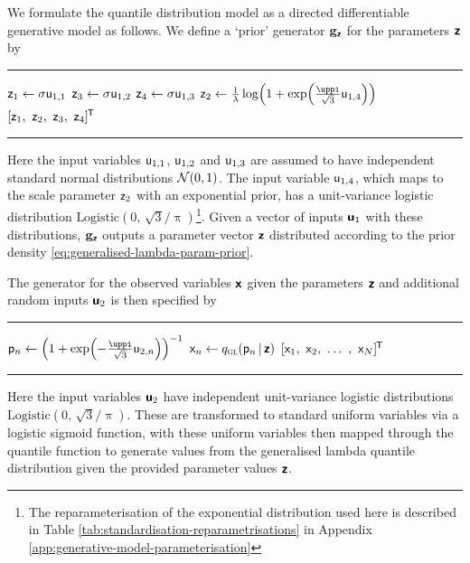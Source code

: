 We formulate the quantile distribution model as a directed differentiable generative model as follows. We define a `prior' generator ${\mathbf{g}}_{\boldsymbol{\mathsf{z}}}$ for the parameters $\boldsymbol{\mathsf{z}}$ by
\vspace{3mm}
\hrule
\begin{algorithmic}
\small
{}
  \State $\mathsf{z}_1 \gets \sigma \mathsf{u}_{1,1}$
  \State $\mathsf{z}_3 \gets \sigma \mathsf{u}_{1,2}$
  \State $\mathsf{z}_4 \gets \sigma \mathsf{u}_{1,3}$
  \State $\rvar{z}_2 \gets \frac{1}{\lambda} \log\lpa 1 + \exp\lpa \frac{\uppi}{\sqrt{3}} \rvar{u}_{1,4}\rpa\rpa$
  \State \Return $[\mathsf{z}_1,~\mathsf{z}_2,~\mathsf{z}_3,~\mathsf{z}_4]^{\mkern-1.5mu\mathsf{T}}$
\EndFunction
\end{algorithmic}
\vspace{0mm}
\hrule
\vspace{1mm}
Here the input variables $\mathsf{u}_{1,1}$, $\mathsf{u}_{1,2}$ and $\mathsf{u}_{1,3}$ are assumed to have independent standard normal distributions $\nrm{0,1}$. The input variable $\mathsf{u}_{1,4}$, which maps to the scale parameter $\mathsf{z}_2$ with an exponential prior, has a unit-variance logistic distribution $\textrm{Logistic}(0,\,\sqrt{3}/\uppi)$\footnote{The reparameterisation of the exponential distribution used here is described in Table \ref{tab:standardisation-reparametrisations} in Appendix \ref{app:generative-model-parameterisation}}. Given a vector of inputs $\boldsymbol{\mathsf{u}}_1$ with these distributions, ${\mathbf{g}}_{\boldsymbol{\mathsf{z}}}$ outputs a parameter vector $\boldsymbol{\mathsf{z}}$ distributed according to the prior density \eqref{eq:generalised-lambda-param-prior}.

The generator for the observed variables $\boldsymbol{\mathsf{x}}$ given the parameters $\boldsymbol{\mathsf{z}}$ and additional random inputs $\boldsymbol{\mathsf{u}}_2$ is then specified by
\vspace{3mm}
\hrule
\begin{algorithmic}
\small
{}
    \State $\rvar{p}_n \gets \lpa 1 + \exp\lpa-\frac{\uppi}{\sqrt{3}}\rvar{u}_{2,n}\rpa\rpa^{-1}$
    \State $\mathsf{x}_n \gets q_{\textsc{gl}}(\mathsf{p}_{n} \operatorname{|} \boldsymbol{\mathsf{z}})$
  \EndFor
  \State \Return $[\mathsf{x}_1,~\mathsf{x}_2,~\dots~,~\mathsf{x}_N]^{\mkern-1.5mu\mathsf{T}}$
\EndFunction
\end{algorithmic}
\hrule
\vspace{1mm}
Here the input variables $\boldsymbol{\mathsf{u}}_2$ have independent unit-variance logistic distributions $\textrm{Logistic}(0,\,\sqrt{3}/\uppi)$. These are transformed to standard uniform variables via a logistic sigmoid function, with these uniform variables then mapped through the quantile function to generate values from the generalised lambda quantile distribution given the provided parameter values $\boldsymbol{\mathsf{z}}$.

